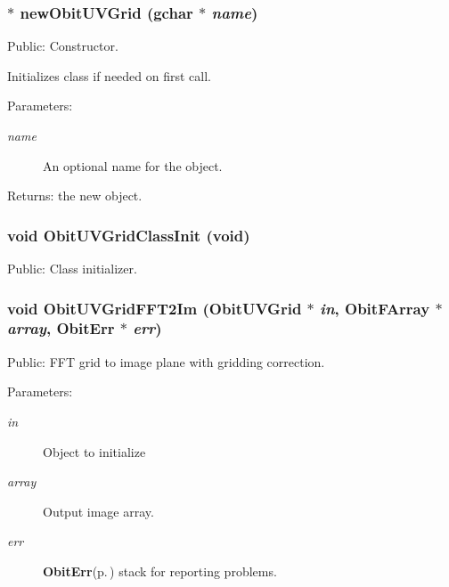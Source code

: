 \subsubsection{$\ast$ new\-Obit\-UVGrid (gchar $\ast$ {\em name})}\label{ObitUVGrid_8h_a9}


Public: Constructor. 

Initializes class if needed on first call. \begin{Desc}
\item[Parameters:]
\begin{description}
\item[{\em name}]An optional name for the object. \end{description}
\end{Desc}
\begin{Desc}
\item[Returns:]the new object. \end{Desc}
\subsubsection{\setlength{\rightskip}{0pt plus 5cm}void Obit\-UVGrid\-Class\-Init (void)}\label{ObitUVGrid_8h_a8}


Public: Class initializer. 

\subsubsection{\setlength{\rightskip}{0pt plus 5cm}void Obit\-UVGrid\-FFT2Im ({\bf Obit\-UVGrid} $\ast$ {\em in}, {\bf Obit\-FArray} $\ast$ {\em array}, {\bf Obit\-Err} $\ast$ {\em err})}\label{ObitUVGrid_8h_a14}


Public: FFT grid to image plane with gridding correction. 

\begin{Desc}
\item[Parameters:]
\begin{description}
\item[{\em in}]Object to initialize \item[{\em array}]Output image array. \item[{\em err}]{\bf Obit\-Err}{\rm (p.\,\pageref{structObitErr})} stack for reporting problems. \end{description}
\end{Desc}
